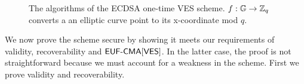 \begin{figure}[h]
\begin{mdframed}
\begin{pchstack}[center]
    \pchspace
    \pchspace
    \pchspace
    \end{pchstack}
    \end{mdframed}
    \caption{The algorithms of the ECDSA one-time VES scheme. $f: \mathbb{G} \rightarrow \mathbb{Z}_q$ converts a an elliptic curve point to its x-coordinate mod $q$.}
    \label{fig:ecdsa-adaptor}
\end{figure}

We now prove the scheme secure by showing it meets our requirements of validity, recoverability and $\textsf{EUF-CMA}[\textsf{VES}]$.
In the latter case, the proof is not straightforward because we must account for a weakness in the scheme.
First we prove validity and recoverability.


